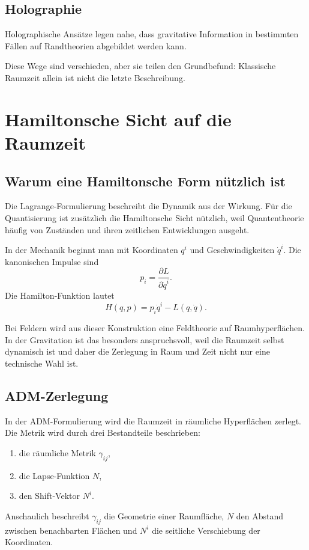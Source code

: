 \documentclass[11pt,a4paper,oneside]{book}
\theoremstyle{definition}
\theoremstyle{plain}
\theoremstyle{remark}
\begin{document}
\section{Holographie}
Holographische Ansätze legen nahe, dass gravitative Information in bestimmten Fällen auf Randtheorien abgebildet werden kann.

Diese Wege sind verschieden, aber sie teilen den Grundbefund: Klassische Raumzeit allein ist nicht die letzte Beschreibung.


\chapter{Hamiltonsche Sicht auf die Raumzeit}
\section{Warum eine Hamiltonsche Form nützlich ist}
Die Lagrange-Formulierung beschreibt die Dynamik aus der Wirkung. Für die Quantisierung ist zusätzlich die Hamiltonsche Sicht nützlich, weil Quantentheorie häufig von Zuständen und ihren zeitlichen Entwicklungen ausgeht.

In der Mechanik beginnt man mit Koordinaten $q^i$ und Geschwindigkeiten $\dot q^i$. Die kanonischen Impulse sind
\[
p_i=\frac{\partial L}{\partial \dot q^i}.
\]
Die Hamilton-Funktion lautet
\[
H(q,p)=p_i\dot q^i-L(q,\dot q).
\]

Bei Feldern wird aus dieser Konstruktion eine Feldtheorie auf Raumhyperflächen. In der Gravitation ist das besonders anspruchsvoll, weil die Raumzeit selbst dynamisch ist und daher die Zerlegung in Raum und Zeit nicht nur eine technische Wahl ist.

\section{ADM-Zerlegung}
In der ADM-Formulierung wird die Raumzeit in räumliche Hyperflächen zerlegt. Die Metrik wird durch drei Bestandteile beschrieben:

\begin{enumerate}[label=\arabic*.]
\item die räumliche Metrik $\gamma_{ij}$,
\item die Lapse-Funktion $N$,
\item den Shift-Vektor $N^i$.
\end{enumerate}

Anschaulich beschreibt $\gamma_{ij}$ die Geometrie einer Raumfläche, $N$ den Abstand zwischen benachbarten Flächen und $N^i$ die seitliche Verschiebung der Koordinaten.
\end{document}
